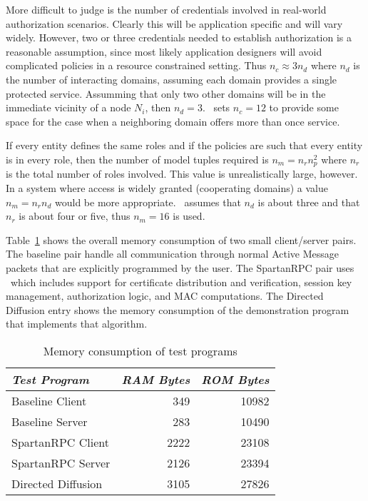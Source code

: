 More difficult to judge is the number of credentials involved in real-world authorization
scenarios. Clearly this will be application specific and will vary widely. However, two or three
credentials needed to establish authorization is a reasonable assumption, since most likely
application designers will avoid complicated policies in a resource constrained setting. Thus
$n_c \approx 3 n_d$ where $n_d$ is the number of interacting domains, assuming each domain
provides a single protected service. Assumming that only two other domains will be in the
immediate vicinity of a node $N_i$, then $n_d = 3$. \Sprocket\ sets $n_c = 12$ to provide some
space for the case when a neighboring domain offers more than once service.

If every entity defines the same roles and if the policies are such that every entity is in
every role, then the number of model tuples required is $n_m = n_r n_p^2$ where $n_r$ is the
total number of roles involved. This value is unrealistically large, however. In a system where
access is widely granted (cooperating domains) a value $n_m = n_r n_d$ would be more
appropriate. \Sprocket\ assumes that $n_d$ is about three and that $n_r$ is about four or five,
thus $n_m = 16$ is used.

Table~\ref{table-test-program-ram} shows the overall memory consumption of two small
client/server pairs. The baseline pair handle all communication through normal Active Message
packets that are explicitly programmed by the user. The SpartanRPC pair uses \Sprocket\ which
includes support for certificate distribution and verification, session key management,
authorization logic, and MAC computations. The Directed Diffusion entry shows the memory
consumption of the demonstration program that implements that algorithm.

\begin{table}[!t]
  \newcommand\T{\rule{0pt}{2.1ex}}
  \centering
  \caption{Memory consumption of test programs}
  {
  \begin{tabular}{|l|r|r|} \hline
    \textit{Test Program} \T & \textit{RAM Bytes} & \textit{ROM Bytes} \\
    \hline \hline

    Baseline Client    \T &  349 & 10982 \\ \hline 
    Baseline Server    \T &  283 & 10490 \\ \hline
    SpartanRPC Client  \T & 2222 & 23108 \\ \hline
    SpartanRPC Server  \T & 2126 & 23394 \\ \hline
    Directed Diffusion \T & 3105 & 27826 \\ \hline
  \end{tabular}
  }
  \label{table-test-program-ram}
\end{table}


